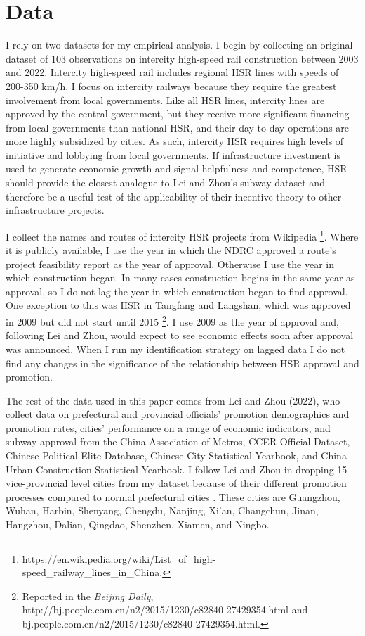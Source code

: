 \documentclass[12pt, ]{article}
\begin{document}
\hypertarget{data}{%
\section{Data}\label{data}}

I rely on two datasets for my empirical analysis. I begin by collecting
an original dataset of 103 observations on intercity high-speed rail
construction between 2003 and 2022. Intercity high-speed rail includes
regional HSR lines with speeds of 200-350 km/h. I focus on intercity
railways because they require the greatest involvement from local
governments. Like all HSR lines, intercity lines are approved by the
central government, but they receive more significant financing from
local governments than national HSR, and their day-to-day operations are
more highly subsidized by cities. As such, intercity HSR requires high
levels of initiative and lobbying from local governments. If
infrastructure investment is used to generate economic growth and signal
helpfulness and competence, HSR should provide the closest analogue to
Lei and Zhou's subway dataset and therefore be a useful test of the
applicability of their incentive theory to other infrastructure
projects.

I collect the names and routes of intercity HSR projects from Wikipedia
\footnote{https://en.wikipedia.org/wiki/List\_of\_high-speed\_railway\_lines\_in\_China.}.
Where it is publicly available, I use the year in which the NDRC
approved a route's project feasibility report as the year of approval.
Otherwise I use the year in which construction began. In many cases
construction begins in the same year as approval, so I do not lag the
year in which construction began to find approval. One exception to this
was HSR in Tangfang and Langshan, which was approved in 2009 but did not
start until 2015 \footnote{Reported in the \emph{Beijing Daily},
  http://bj.people.com.cn/n2/2015/1230/c82840-27429354.html and
  bj.people.com.cn/n2/2015/1230/c82840-27429354.html.}. I use 2009 as
the year of approval and, following Lei and Zhou, would expect to see
economic effects soon after approval was announced. When I run my
identification strategy on lagged data I do not find any changes in the
significance of the relationship between HSR approval and promotion.

The rest of the data used in this paper comes from Lei and Zhou (2022),
who collect data on prefectural and provincial officials' promotion
demographics and promotion rates, cities' performance on a range of
economic indicators, and subway approval from the China Association of
Metros, CCER Official Dataset, Chinese Political Elite Database, Chinese
City Statistical Yearbook, and China Urban Construction Statistical
Yearbook. I follow Lei and Zhou in dropping 15 vice-provincial level
cities from my dataset because of their different promotion processes
compared to normal prefectural cities \citep{lei_private_2022}. These
cities are Guangzhou, Wuhan, Harbin, Shenyang, Chengdu, Nanjing, Xi'an,
Changchun, Jinan, Hangzhou, Dalian, Qingdao, Shenzhen, Xiamen, and
Ningbo.
\end{document}
